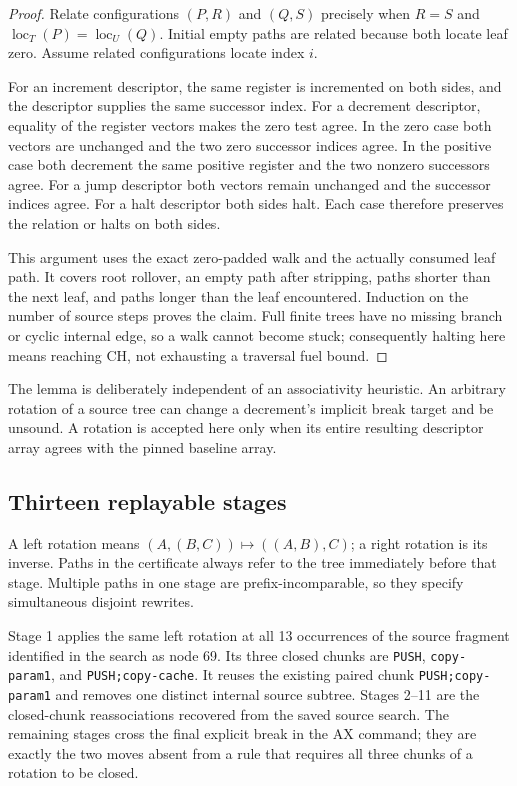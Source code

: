 \begin{proof}
Relate configurations $(P,R)$ and $(Q,S)$ precisely when $R=S$ and
$\operatorname{loc}_T(P)=\operatorname{loc}_U(Q)$.  Initial empty paths
are related because both locate leaf zero.  Assume related configurations
locate index $i$.

For an increment descriptor, the same register is incremented on both
sides, and the descriptor supplies the same successor index.  For a
decrement descriptor, equality of the register vectors makes the zero
test agree.  In the zero case both vectors are unchanged and the two zero
successor indices agree.  In the positive case both decrement the same
positive register and the two nonzero successors agree.  For a jump
descriptor both vectors remain unchanged and the successor indices
agree.  For a halt descriptor both sides halt.  Each case therefore
preserves the relation or halts on both sides.

This argument uses the exact zero-padded walk and the actually consumed
leaf path.  It covers root rollover, an empty path after stripping, paths
shorter than the next leaf, and paths longer than the leaf encountered.
Induction on the number of source steps proves the claim.  Full finite
trees have no missing branch or cyclic internal edge, so a walk cannot
become stuck; consequently halting here means reaching $\mathrm{CH}$,
not exhausting a traversal fuel bound.
\end{proof}

The lemma is deliberately independent of an associativity heuristic.
An arbitrary rotation of a source tree can change a decrement's implicit
break target and be unsound.  A rotation is accepted here only when its
entire resulting descriptor array agrees with the pinned baseline array.

\subsection{Thirteen replayable stages}

A left rotation means $(A,(B,C))\mapsto((A,B),C)$; a right rotation is its
inverse.  Paths in the certificate always refer to the tree immediately
before that stage.  Multiple paths in one stage are prefix-incomparable,
so they specify simultaneous disjoint rewrites.

Stage 1 applies the same left rotation at all 13 occurrences of the source
fragment identified in the search as node 69.  Its three closed chunks are
\texttt{PUSH}, \texttt{copy-param1}, and
\texttt{PUSH;copy-cache}.  It reuses the existing paired chunk
\texttt{PUSH;copy-param1} and removes one distinct internal source subtree.
Stages 2--11 are the closed-chunk reassociations recovered from the saved
source search.  The remaining stages cross the final explicit break in
the AX command; they are exactly the two moves absent from a rule that
requires all three chunks of a rotation to be closed.

